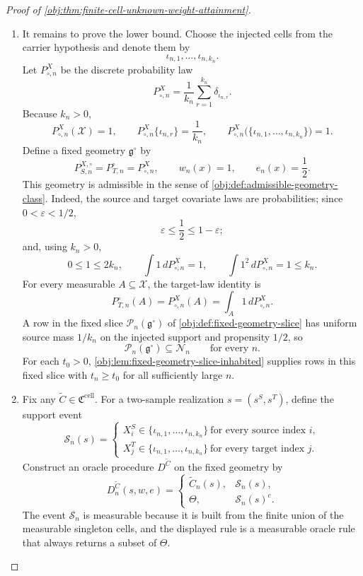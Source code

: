 \begin{proof}[Proof of \cref{obj:thm:finite-cell-unknown-weight-attainment}]
\begin{enumerate}
\item
It remains to prove the lower bound.  Choose the injected cells from the carrier hypothesis and denote them by
\[
\iota_{n,1},\ldots,\iota_{n,k_n}.
\]
Let \(P_{\circ,n}^X\) be the discrete probability law
\[
P_{\circ,n}^X
=
\frac1{k_n}\sum_{r=1}^{k_n}\delta_{\iota_{n,r}}.
\]
Because \(k_n>0\),
\[
P_{\circ,n}^X(\mathcal X)=1,
\qquad
P_{\circ,n}^X\{\iota_{n,r}\}=\frac1{k_n},
\qquad
P_{\circ,n}^X\bigl(\{\iota_{n,1},\ldots,\iota_{n,k_n}\}\bigr)=1 .
\]
Define a fixed geometry \(\mathfrak g^\circ\) by
\[
P_{S,n}^{X,\circ}=P_{T,n}^{\circ}=P_{\circ,n}^X,
\qquad
w_n(x)=1,
\qquad
e_n(x)=\frac12 .
\]
This geometry is admissible in the sense of \cref{obj:def:admissible-geometry-class}.  Indeed, the source and target covariate laws are probabilities; since \(0<\varepsilon<1/2\),
\[
\varepsilon\le \frac12\le 1-\varepsilon;
\]
and, using \(k_n>0\),
\[
0\le 1\le 2k_n,
\qquad
\int 1\,dP_{\circ,n}^X=1,
\qquad
\int 1^2\,dP_{\circ,n}^X=1\le k_n.
\]
For every measurable \(A\subseteq\mathcal X\), the target-law identity is
\[
P_{T,n}^{\circ}(A)
=
P_{\circ,n}^X(A)
=
\int_A 1\,dP_{\circ,n}^X .
\]
A row in the fixed slice \(\mathcal P_n(\mathfrak g^\circ)\) of \cref{obj:def:fixed-geometry-slice} has uniform source mass \(1/k_n\) on the injected support and propensity \(1/2\), so
\[
\mathcal P_n(\mathfrak g^\circ)\subseteq \mathcal N_n
\qquad\text{for every }n.
\]
For each \(t_0>0\), \cref{obj:lem:fixed-geometry-slice-inhabited} supplies rows in this fixed slice with \(t_n\ge t_0\) for all sufficiently large \(n\).

\item
Fix any \(\widetilde C\in\mathfrak C^{\mathrm{cell}}\).  For a two-sample realization \(s=(s^S,s^T)\), define the support event
\[
\mathcal S_n(s)
=
\left\{
\begin{array}{l}
X_i^S\in\{\iota_{n,1},\ldots,\iota_{n,k_n}\}\ \text{for every source index }i,\\[2mm]
X_j^T\in\{\iota_{n,1},\ldots,\iota_{n,k_n}\}\ \text{for every target index }j .
\end{array}
\right.
\]
Construct an oracle procedure \(D^{\widetilde C}\) on the fixed geometry by
\[
D^{\widetilde C}_n(s,w,e)
=
\begin{cases}
\widetilde C_n(s), & \mathcal S_n(s),\\
\Theta, & \mathcal S_n(s)^c .
\end{cases}
\]
The event \(\mathcal S_n\) is measurable because it is built from the finite union of the measurable singleton cells, and the displayed rule is a measurable oracle rule that always returns a subset of \(\Theta\).


\end{enumerate}
\end{proof}
